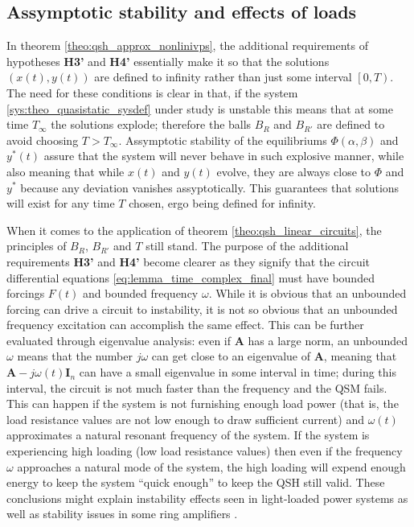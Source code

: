 \subsection{Assymptotic stability and effects of loads} %

	In theorem \ref{theo:qsh_approx_nonlinivps}, the additional requirements of hypotheses \textbf{H3'} and \textbf{H4'} essentially make it so that the solutions $\left(x(t),y(t)\right)$ are defined to infinity rather than just some interval $\left[0,T\right)$. The need for these conditions is clear in that, if the system \eqref{sys:theo_quasistatic_sysdef} under study is unstable this means that at some time $T_\infty$ the solutions explode; therefore the balls $B_R$ and $B_{R'}$ are defined to avoid choosing $T > T_\infty$. Assymptotic stability of the equilibriums $\Phi\left(\alpha,\beta\right)$ and $y^*(t)$ assure that the system will never behave in such explosive manner, while also meaning that while $x(t)$ and $y(t)$ evolve, they are always close to $\Phi$ and $y^*$ because any deviation vanishes assyptotically. This guarantees that solutions will exist for any time $T$ chosen, ergo being defined for infinity.

	When it comes to the application of theorem \ref{theo:qsh_linear_circuits}, the principles of $B_R$, $B_{R'}$ and $T$ still stand. The purpose of the additional requirements \textbf{H3'} and \textbf{H4'} become clearer as they signify that the circuit differential equations \eqref{eq:lemma_time_complex_final} must have bounded forcings $F(t)$ and bounded frequency $\omega$. While it is obvious that an unbounded forcing can drive a circuit to instability, it is not so obvious that an unbounded frequency excitation can accomplish the same effect. This can be further evaluated through eigenvalue analysis: even if $\mathbf{A}$ has a large norm, an unbounded $\omega$ means that the number $j\omega$ can get close to an eigenvalue of $\mathbf{A}$, meaning that $\mathbf{A} - j\omega(t)\mathbf{I}_n$ can have a small eigenvalue in some interval in time; during this interval, the circuit is not much faster than the frequency and the QSM fails. This can happen if the system is not furnishing enough load power (that is, the load resistance values are not low enough to draw sufficient current) and $\omega(t)$ approximates a natural resonant frequency of the system. If the system is experiencing high loading (low load resistance values) then even if the frequency $\omega$ approaches a natural mode of the system, the high loading will expend enough energy to keep the system ``quick enough'' to keep the QSH still valid. These conclusions might explain instability effects seen in light-loaded power systems  as well as stability issues in some ring amplifiers .

